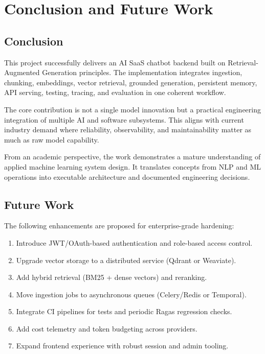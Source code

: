 \documentclass[12pt,letterpaper]{report}
\begin{document}
\chapter{Conclusion and Future Work}

\section{Conclusion}
This project successfully delivers an AI SaaS chatbot backend built on Retrieval-Augmented Generation principles. The implementation integrates ingestion, chunking, embeddings, vector retrieval, grounded generation, persistent memory, API serving, testing, tracing, and evaluation in one coherent workflow.

The core contribution is not a single model innovation but a practical engineering integration of multiple AI and software subsystems. This aligns with current industry demand where reliability, observability, and maintainability matter as much as raw model capability.

From an academic perspective, the work demonstrates a mature understanding of applied machine learning system design. It translates concepts from NLP and ML operations into executable architecture and documented engineering decisions.

\section{Future Work}
The following enhancements are proposed for enterprise-grade hardening:
\begin{enumerate}
\item Introduce JWT/OAuth-based authentication and role-based access control.
\item Upgrade vector storage to a distributed service (Qdrant or Weaviate).
\item Add hybrid retrieval (BM25 + dense vectors) and reranking.
\item Move ingestion jobs to asynchronous queues (Celery/Redis or Temporal).
\item Integrate CI pipelines for tests and periodic Ragas regression checks.
\item Add cost telemetry and token budgeting across providers.
\item Expand frontend experience with robust session and admin tooling.
\end{enumerate}
\end{document}
